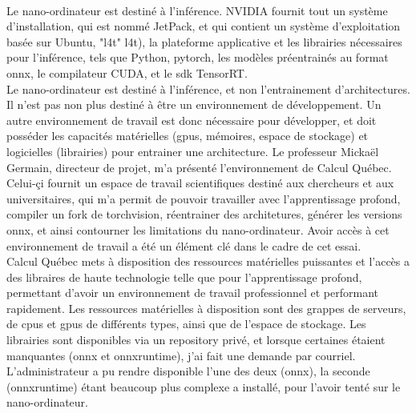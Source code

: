 ﻿
\vspace{0.5\baselineskip}
\\
\noindent Le nano-ordinateur est destiné à l'inférence. NVIDIA fournit tout un système d'installation, qui est nommé JetPack, et qui contient un système d'exploitation basée sur Ubuntu, "\acrlong{l4t}" \acrshort{l4t}), la plateforme applicative et les librairies nécessaires pour l'inférence, tels que Python, pytorch, les modèles préentrainés au format \acrshort{onnx}, le compilateur CUDA, et le \acrshort{sdk} TensorRT.
\vspace{0.5\baselineskip}
\\
\noindent Le nano-ordinateur est destiné à l'inférence, et non l'entrainement d'architectures. Il n'est pas non plus destiné à être un environnement de développement. Un autre environnement de travail est donc nécessaire pour développer, et doit posséder les capacités matérielles (\acrshort{gpu}s, mémoires, espace de stockage) et logicielles (librairies) pour entrainer une architecture. Le professeur Mickaël Germain, directeur de projet, m'a présenté l'environnement de Calcul Québec. Celui-çi fournit un espace de travail scientifiques destiné aux chercheurs et aux universitaires, qui m'a permit  de pouvoir travailler avec l'apprentissage profond, compiler un fork de torchvision, réentrainer des architetures, générer les versions \acrshort{onnx}, et ainsi contourner les limitations du nano-ordinateur. Avoir accès à cet environnement de travail a été un élément clé dans le cadre de cet essai.
\vspace{0.5\baselineskip}
\\
\noindent Calcul Québec mets à disposition des ressources matérielles puissantes et l'accès a des libraires de haute technologie telle que pour l'apprentissage profond, permettant d'avoir un environnement de travail professionnel et performant rapidement. Les ressources matérielles à disposition sont des grappes de serveurs, de \acrshort{cpu}s et \acrshort{gpu}s de différents types, ainsi que de l'espace de stockage. Les librairies sont disponibles via un repository privé, et lorsque certaines étaient manquantes (\acrshort{onnx} et onnxruntime), j'ai fait une demande par courriel. L'administrateur a pu rendre disponible l'une des deux (\acrshort{onnx}), la seconde (onnxruntime) étant beaucoup plus complexe a installé, pour l'avoir tenté sur le nano-ordinateur. 
\vspace{0.5\baselineskip}
\\
